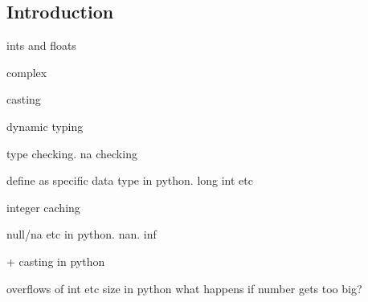 
\subsection{Introduction}

ints and floats

complex

casting 

dynamic typing


type checking. na checking

define as specific data type in python. long int etc

integer caching

null/na etc in python. nan. inf

+ casting in python

overflows of int etc size in python
what happens if number gets too big?
